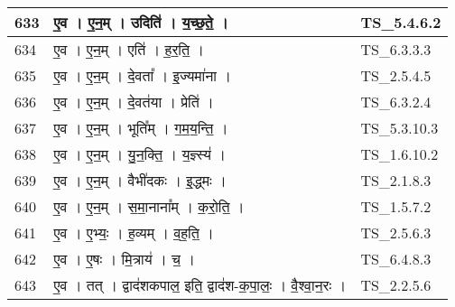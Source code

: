 \documentclass[17pt]{extarticle}
\begin{document}
\begin{longtable}{||p{0.4in}||p{4.9in}||p{0.9in}||}
    \hline
        
    633 & ए॒व   ।   ए॒न॒म्   ।   उदिति॑   ।   य॒च्छ॒ते॒   ।    & TS\_5.4.6.2       \\
    
    \hline
        
    634 & ए॒व   ।   ए॒न॒म्   ।   एति॑   ।   ह॒र॒ति॒   ।    & TS\_6.3.3.3       \\
    
    \hline
        
    635 & ए॒व   ।   ए॒न॒म्   ।   दे॒वता᳚   ।   इ॒ज्यमा॑ना   ।    & TS\_2.5.4.5       \\
    
    \hline
        
    636 & ए॒व   ।   ए॒न॒म्   ।   दे॒वत॑या   ।   प्रेति॑   ।    & TS\_6.3.2.4       \\
    
    \hline
        
    637 & ए॒व   ।   ए॒न॒म्   ।   भूति᳚म्   ।   ग॒म॒य॒न्ति॒   ।    & TS\_5.3.10.3       \\
    
    \hline
        
    638 & ए॒व   ।   ए॒न॒म्   ।   यु॒न॒क्ति॒   ।   य॒ज्ञ्स्य॑   ।    & TS\_1.6.10.2       \\
    
    \hline
        
    639 & ए॒व   ।   ए॒न॒म्   ।   वैभी॑दकः   ।   इ॒द्ध्मः   ।    & TS\_2.1.8.3       \\
    
    \hline
        
    640 & ए॒व   ।   ए॒न॒म्   ।   स॒मा॒नाना᳚म्   ।   क॒रो॒ति॒   ।    & TS\_1.5.7.2       \\
    
    \hline
        
    641 & ए॒व   ।   ए॒भ्यः॒   ।   ह॒व्यम्   ।   व॒ह॒ति॒   ।    & TS\_2.5.6.3       \\
    
    \hline
        
    642 & ए॒व   ।   ए॒षः   ।   मि॒त्राय॑   ।   च॒   ।    & TS\_6.4.8.3       \\
    
    \hline
        
    643 & ए॒व   ।   तत्   ।   द्वाद॑शकपाल॒ इति॒ द्वाद॑श{-}क॒पा॒लः॒   ।   वै॒श्वा॒न॒रः   ।    & TS\_2.2.5.6       \\
    
    \hline
        

\end{longtable}
\end{document}
